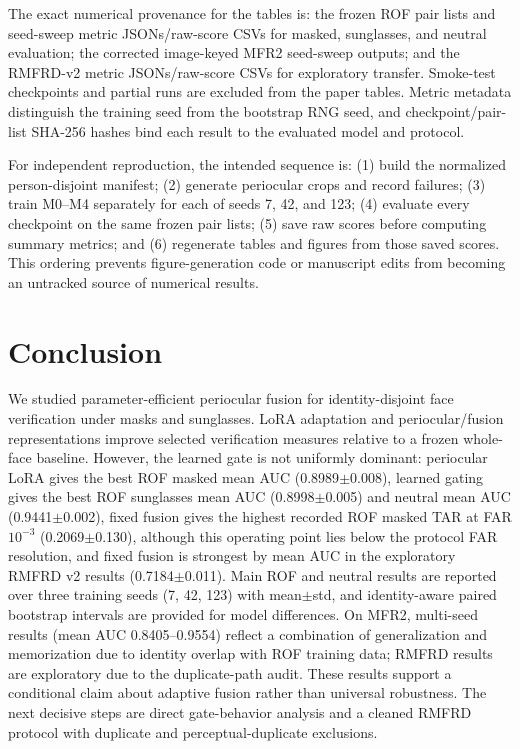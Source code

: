 ﻿\documentclass[10pt,journal,compsoc]{IEEEtran}
\begin{document}
The exact numerical provenance for the tables is: the frozen ROF pair lists and seed-sweep metric JSONs/raw-score CSVs for masked, sunglasses, and neutral evaluation; the corrected image-keyed MFR2 seed-sweep outputs; and the RMFRD-v2 metric JSONs/raw-score CSVs for exploratory transfer. Smoke-test checkpoints and partial runs are excluded from the paper tables. Metric metadata distinguish the training seed from the bootstrap RNG seed, and checkpoint/pair-list SHA-256 hashes bind each result to the evaluated model and protocol.

For independent reproduction, the intended sequence is: (1) build the normalized person-disjoint manifest; (2) generate periocular crops and record failures; (3) train M0--M4 separately for each of seeds 7, 42, and 123; (4) evaluate every checkpoint on the same frozen pair lists; (5) save raw scores before computing summary metrics; and (6) regenerate tables and figures from those saved scores. This ordering prevents figure-generation code or manuscript edits from becoming an untracked source of numerical results.
\section{Conclusion}
We studied parameter-efficient periocular fusion for identity-disjoint face verification under masks and sunglasses. LoRA adaptation and periocular/fusion representations improve selected verification measures relative to a frozen whole-face baseline. However, the learned gate is not uniformly dominant: periocular LoRA gives the best ROF masked mean AUC (0.8989$\pm$0.008), learned gating gives the best ROF sunglasses mean AUC (0.8998$\pm$0.005) and neutral mean AUC (0.9441$\pm$0.002), fixed fusion gives the highest recorded ROF masked TAR at FAR $10^{-3}$ (0.2069$\pm$0.130), although this operating point lies below the protocol FAR resolution, and fixed fusion is strongest by mean AUC in the exploratory RMFRD v2 results (0.7184$\pm$0.011). Main ROF and neutral results are reported over three training seeds (7, 42, 123) with mean$\pm$std, and identity-aware paired bootstrap intervals are provided for model differences. On MFR2, multi-seed results (mean AUC 0.8405--0.9554) reflect a combination of generalization and memorization due to identity overlap with ROF training data; RMFRD results are exploratory due to the duplicate-path audit. These results support a conditional claim about adaptive fusion rather than universal robustness. The next decisive steps are direct gate-behavior analysis and a cleaned RMFRD protocol with duplicate and perceptual-duplicate exclusions.
\end{document}
